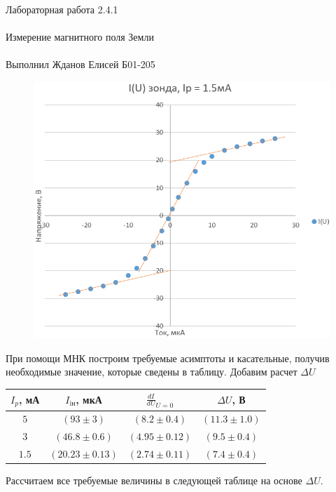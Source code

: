 \documentclass{astroedu-lab}
\begin{document}
\begin{problem}{\huge Лабораторная работа 2.4.1\\\\Измерение магнитного поля Земли\\\\Выполнил Жданов Елисей Б01-205}
\newpage

\begin{figure}[!h]
	\centering
	\includegraphics[width=1\textwidth]{1.5.png}
	\label{fig:boiler}
\end{figure}

\newpage

При помощи МНК построим требуемые асимптоты и касательные, получив необходимые значение, которые сведены в таблицу. Добавим расчет $\Delta U$

\begin{center}
\begin{tabular}{|c|c|c|c|}
\hline 
$I_p$, мА & $I_{\text{iн}}$, мкА & $\frac{dI}{dU}_{U=0}$ & $\Delta U$, В \\
\hline
$5$ 	& $(93 \pm 3)$ & $(8.2 \pm 0.4)$ & $(11.3 \pm 1.0)$ \\
$3$ 	& $(46.8 \pm 0.6)$ & $(4.95 \pm 0.12)$ & $(9.5 \pm 0.4)$ \\
$1.5$ 	& $(20.23 \pm 0.13)$ & $(2.74 \pm 0.11)$ & $(7.4 \pm 0.4)$ \\
\hline
\end{tabular}
\end{center}

Рассчитаем все требуемые величины в следующей таблице на основе $\Delta U$.


\end{problem}
\end{document}
